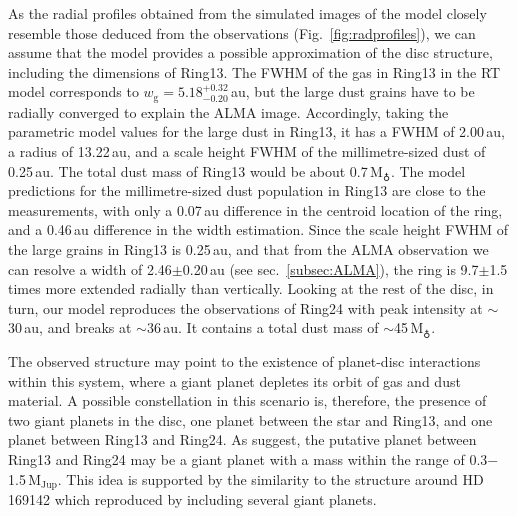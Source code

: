 \documentclass[fleqn,usenatbib,useAMS]{mnras}
\begin{document}
As the radial profiles obtained from the simulated images of the model closely resemble those deduced from the observations (Fig.~\ref{fig:radprofiles}), we can assume that the model provides a possible approximation of the disc structure, including the dimensions of Ring13. The FWHM of the gas in Ring13 in the RT model corresponds to $w_\mathrm{g} = 5.18^{+0.32}_{-0.20}$\,au, but the  large dust grains have to be radially converged to explain the ALMA image. Accordingly, taking the parametric model values for the large dust in Ring13, it has a FWHM of 2.00\,au, a radius of 13.22\,au, and a scale height FWHM of the millimetre-sized dust of 0.25\,au. The total dust mass of Ring13 would be about 0.7\,M$_{\earth}$. The model predictions for the millimetre-sized dust population in Ring13 are close to the measurements, with only a 0.07\,au difference in the centroid location of the ring, and a 0.46\,au difference in the width estimation. Since the scale height FWHM of the large grains in Ring13 is 0.25\,au, and that from the ALMA observation we can resolve a width of 2.46$\pm$0.20\,au (see sec.~\ref{subsec:ALMA}), the ring is 9.7$\pm$1.5 times more extended radially than vertically. Looking at the rest of the disc, in turn, our model reproduces the observations of Ring24 with peak intensity at $\sim$30\,au, and breaks at $\sim$36\,au. It contains a total dust mass of $\sim$45\,M$_{\earth}$.%

The observed structure may point to the existence of planet-disc interactions within this system, where a giant planet depletes its orbit of gas and dust material. A possible constellation in this scenario is, therefore, the presence of two giant planets in the disc, one planet between the star and Ring13, and one planet between Ring13 and Ring24. As \citet{Ru_z_Rodr_guez_2019} suggest, the putative planet between Ring13 and Ring24 may be a giant planet with a mass within the range of 0.3$-$1.5\,$\mathrm{M}_{\mathrm{Jup}}$. This idea is supported by the similarity to the structure around HD\,169142 which \citet{2020arXiv200711565B} reproduced by including several giant planets.
\end{document}
